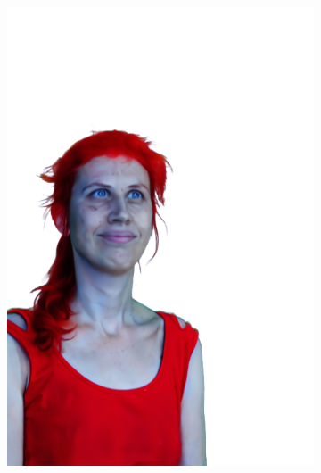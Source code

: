 \begin{figure}[ht]
\begin{subfigure}{0.08\linewidth}
        \includegraphics[width=\textwidth]{Figures/results/high/dora_red/11_render.png}

\end{subfigure}
\end{figure}
